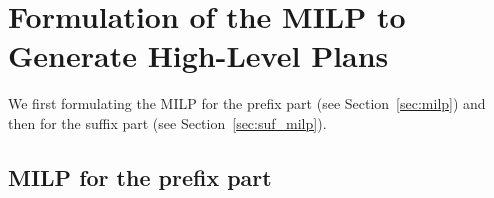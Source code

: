\documentclass[Afour,sageh,times]{sagej}
\newcommand{\auto}[1]{\ccalA_{\textup{#1}}}
\newcommand{\aap}[4]{\mathcal{\pi}_{{#1},{#2}}^{#3,#4}}
\begin{document}
{%


\appendix
\section{Formulation of the MILP to Generate High-Level Plans}
We first formulating the MILP for the prefix part (see Section~\ref{sec:milp}) and then for the suffix part (see Section~\ref{sec:suf_milp}).
\subsection{MILP for the prefix part}\label{app:appendix_prefix_milp}
}
\end{document}
